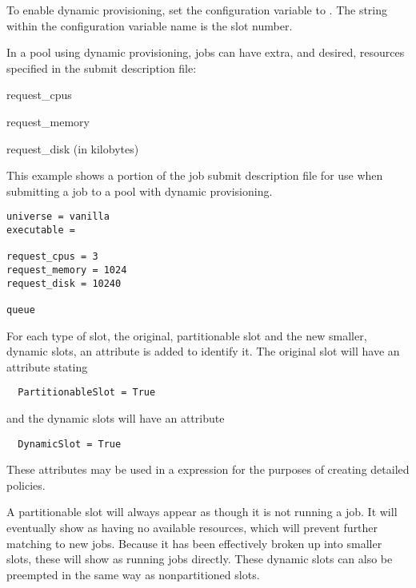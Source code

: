 To enable dynamic provisioning, 
set the  configuration variable 
to .
The string  within the configuration variable name
is the slot number.

In a pool using dynamic provisioning, 
jobs can have extra, and desired, resources specified in the submit
description file:
\begin{description}
  \item{request\_cpus}
  \item{request\_memory}
  \item{request\_disk (in kilobytes)}
\end{description}

This example shows a portion of the job submit description file
for use when submitting a job to a pool with dynamic provisioning.
\begin{verbatim}
universe = vanilla
executable = 

request_cpus = 3
request_memory = 1024
request_disk = 10240

queue 
\end{verbatim}

For each type of slot,
the original, partitionable slot and the new smaller, dynamic slots,
an attribute is added to identify it.
The original slot will have an attribute stating 
\begin{verbatim}
  PartitionableSlot = True
\end{verbatim}
and the dynamic slots will have an attribute 
\begin{verbatim}
  DynamicSlot = True
\end{verbatim}
These attributes may be used in a  expression for 
the purposes of creating detailed policies.

A partitionable slot will always appear as though it is not running a job.
It will eventually show as having no available resources, 
which will prevent further matching to new jobs.
Because it has been effectively broken up into smaller slots,
these will show as running jobs directly.
These dynamic slots can also be preempted in the same way as 
nonpartitioned slots.

